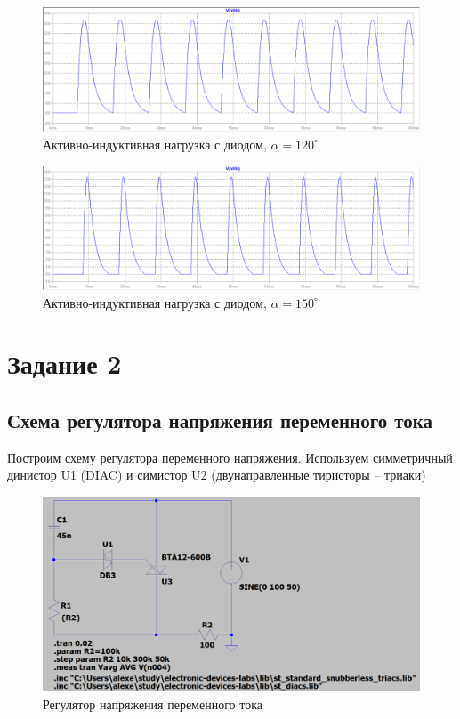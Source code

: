 \documentclass[a4paper, 12pt]{article}
\begin{document}
    \begin{figure}[H]
        \centering
        \includegraphics[scale=0.45]{a120_L20m_D.png}
        \captionsetup{skip=0pt}
        \caption{Активно-индуктивная нагрузка с диодом, $\alpha=120^{\circ}$}
        \label{fig:a120_L20m_D}
    \end{figure}
    \begin{figure}[H]
        \centering
        \includegraphics[scale=0.45]{a150_L20m_D.png}
        \captionsetup{skip=0pt}
        \caption{Активно-индуктивная нагрузка с диодом, $\alpha=150^{\circ}$}
        \label{fig:a150_L20m_D}
    \end{figure}
    \vfill


    \section{Задание 2}
    \subsection{Схема регулятора напряжения переменного тока}
    Построим схему регулятора переменного напряжения. Используем симметричный динистор U1 (DIAC)
    и симистор U2 (двунаправленные тиристоры -- триаки)
    \begin{figure}[H]
        \centering
        \includegraphics[scale=0.3]{scheme4.png}
        \captionsetup{skip=0pt}
        \caption{Регулятор напряжения переменного тока}
        \label{fig:scheme4}
    \end{figure}
\end{document}
